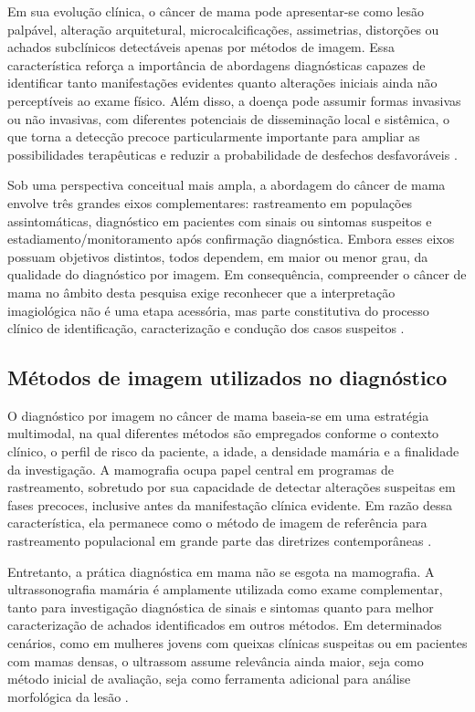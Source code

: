 \documentclass[tcc,capa]{texufpel}
\begin{document}
Em sua evolução clínica, o câncer de mama pode apresentar-se como lesão palpável, alteração arquitetural, microcalcificações, assimetrias, distorções ou achados subclínicos detectáveis apenas por métodos de imagem. Essa característica reforça a importância de abordagens diagnósticas capazes de identificar tanto manifestações evidentes quanto alterações iniciais ainda não perceptíveis ao exame físico. Além disso, a doença pode assumir formas invasivas ou não invasivas, com diferentes potenciais de disseminação local e sistêmica, o que torna a detecção precoce particularmente importante para ampliar as possibilidades terapêuticas e reduzir a probabilidade de desfechos desfavoráveis \cite{INCADiretrizesMama,NCIBreastDiagnosis2025}.

Sob uma perspectiva conceitual mais ampla, a abordagem do câncer de mama envolve três grandes eixos complementares: rastreamento em populações assintomáticas, diagnóstico em pacientes com sinais ou sintomas suspeitos e estadiamento/monitoramento após confirmação diagnóstica. Embora esses eixos possuam objetivos distintos, todos dependem, em maior ou menor grau, da qualidade do diagnóstico por imagem. Em consequência, compreender o câncer de mama no âmbito desta pesquisa exige reconhecer que a interpretação imagiológica não é uma etapa acessória, mas parte constitutiva do processo clínico de identificação, caracterização e condução dos casos suspeitos \cite{INCADeteccaoPrecoce2022,NCIScreening2025}.

\subsection{Métodos de imagem utilizados no diagnóstico}

O diagnóstico por imagem no câncer de mama baseia-se em uma estratégia multimodal, na qual diferentes métodos são empregados conforme o contexto clínico, o perfil de risco da paciente, a idade, a densidade mamária e a finalidade da investigação. A mamografia ocupa papel central em programas de rastreamento, sobretudo por sua capacidade de detectar alterações suspeitas em fases precoces, inclusive antes da manifestação clínica evidente. Em razão dessa característica, ela permanece como o método de imagem de referência para rastreamento populacional em grande parte das diretrizes contemporâneas \cite{NCIScreening2025,INCADiretrizesMama}.

Entretanto, a prática diagnóstica em mama não se esgota na mamografia. A ultrassonografia mamária é amplamente utilizada como exame complementar, tanto para investigação diagnóstica de sinais e sintomas quanto para melhor caracterização de achados identificados em outros métodos. Em determinados cenários, como em mulheres jovens com queixas clínicas suspeitas ou em pacientes com mamas densas, o ultrassom assume relevância ainda maior, seja como método inicial de avaliação, seja como ferramenta adicional para análise morfológica da lesão \cite{INCAParametrosMama,INCADiretrizesMama}. 
\end{document}
